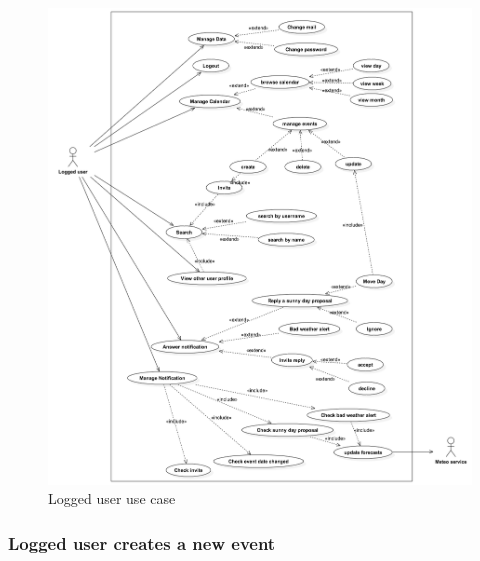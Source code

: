 \documentclass[10pt,a4paper,titlepage]{article}
\begin{document}
\begin{figure}[h!]
\centering
\includegraphics[width=16cm]{./Use_case/logged_usecase.png}
\caption[Logged_usc]{Logged user use case}
\label{fig:Logged_usc}
\end{figure}

\clearpage
\subsubsection{Logged user creates a new event}
\end{document}
